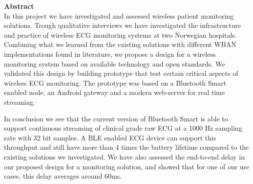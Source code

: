 \noindent \textbf{Abstract}
\\
\newline	
\noindent
In this project we have investigated and assessed wireless patient monitoring solutions. Trough qualitative interviews we have investigated the infrastructure and practice of wireless ECG monitoring systems at two Norwegian hospitals. Combining what we learned from the existing solutions with different WBAN implementations found in literature, we propose a design for a wireless monitoring system based on available technology and open standards. We validated this design by building prototype that test certain critical aspects of wireless ECG monitoring. The prototype was based on a Bluetooth Smart enabled node, an Android gateway and a modern web-server for real time streaming.

In conclusion we see that the current version of Bluetooth Smart is able to support continuous streaming of clinical grade raw ECG at a 1000 Hz sampling rate with 32 bit samples. A BLE enabled ECG device can support this throughput and still have more than 4 times the battery lifetime compared to the existing solutions we investigated. We have also assessed the end-to-end delay in our proposed design for a monitoring solution, and showed that for one of our use cases, this delay averages around 60ms.
